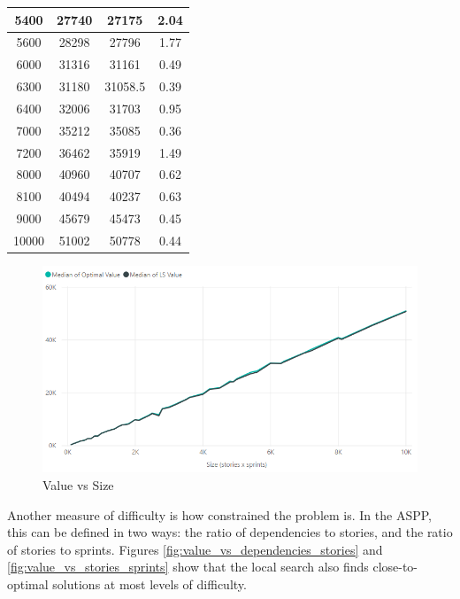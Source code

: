 \begin{table}[]
\begin{tabular}{|c|c|c|c|}
5400 & 27740 & 27175 & 2.04 \\ \hline
5600 & 28298 & 27796 & 1.77 \\ \hline
6000 & 31316 & 31161 & 0.49 \\ \hline
6300 & 31180 & 31058.5 & 0.39 \\ \hline
6400 & 32006 & 31703 & 0.95 \\ \hline
7000 & 35212 & 35085 & 0.36 \\ \hline
7200 & 36462 & 35919 & 1.49 \\ \hline
8000 & 40960 & 40707 & 0.62 \\ \hline
8100 & 40494 & 40237 & 0.63 \\ \hline
9000 & 45679 & 45473 & 0.45 \\ \hline
10000 & 51002 & 50778 & 0.44 \\ \hline
\end{tabular}
\end{table}

\begin{figure}[h!]
    \centering
    \includegraphics[width=\textwidth]{Figures/FinalResults/annealing_value_size.png}
     \caption{Value vs Size}
     \label{fig:value_vs_size}
\end{figure}

Another measure of difficulty is how constrained the problem is. In the ASPP, this can be defined in two ways: the ratio of dependencies to stories, and the ratio of stories to sprints. Figures \ref{fig:value_vs_dependencies_stories} and \ref{fig:value_vs_stories_sprints} show that the local search also finds close-to-optimal solutions at most levels of difficulty.

